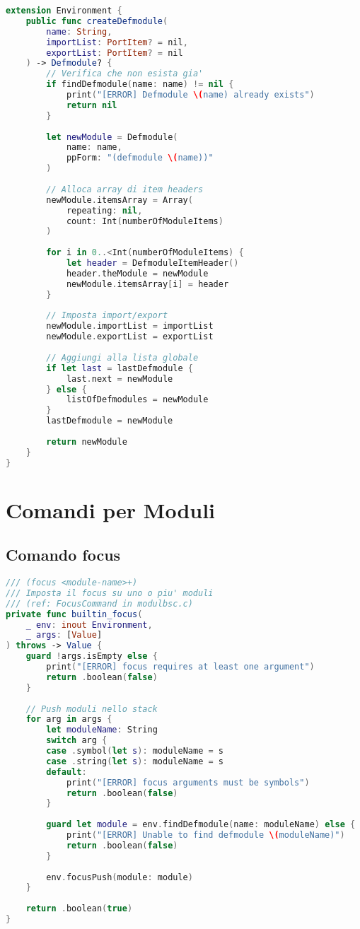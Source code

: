 \begin{lstlisting}[language=Swift]
extension Environment {
    public func createDefmodule(
        name: String,
        importList: PortItem? = nil,
        exportList: PortItem? = nil
    ) -> Defmodule? {
        // Verifica che non esista gia'
        if findDefmodule(name: name) != nil {
            print("[ERROR] Defmodule \(name) already exists")
            return nil
        }
        
        let newModule = Defmodule(
            name: name,
            ppForm: "(defmodule \(name))"
        )
        
        // Alloca array di item headers
        newModule.itemsArray = Array(
            repeating: nil,
            count: Int(numberOfModuleItems)
        )
        
        for i in 0..<Int(numberOfModuleItems) {
            let header = DefmoduleItemHeader()
            header.theModule = newModule
            newModule.itemsArray[i] = header
        }
        
        // Imposta import/export
        newModule.importList = importList
        newModule.exportList = exportList
        
        // Aggiungi alla lista globale
        if let last = lastDefmodule {
            last.next = newModule
        } else {
            listOfDefmodules = newModule
        }
        lastDefmodule = newModule
        
        return newModule
    }
}
\end{lstlisting}

\section{Comandi per Moduli}

\subsection{Comando focus}

\begin{lstlisting}[language=Swift]
/// (focus <module-name>+)
/// Imposta il focus su uno o piu' moduli
/// (ref: FocusCommand in modulbsc.c)
private func builtin_focus(
    _ env: inout Environment,
    _ args: [Value]
) throws -> Value {
    guard !args.isEmpty else {
        print("[ERROR] focus requires at least one argument")
        return .boolean(false)
    }
    
    // Push moduli nello stack
    for arg in args {
        let moduleName: String
        switch arg {
        case .symbol(let s): moduleName = s
        case .string(let s): moduleName = s
        default:
            print("[ERROR] focus arguments must be symbols")
            return .boolean(false)
        }
        
        guard let module = env.findDefmodule(name: moduleName) else {
            print("[ERROR] Unable to find defmodule \(moduleName)")
            return .boolean(false)
        }
        
        env.focusPush(module: module)
    }
    
    return .boolean(true)
}
\end{lstlisting}

